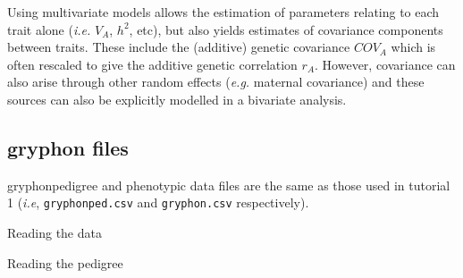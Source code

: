 \documentclass[
  12pt,
]{book}
\newenvironment{Shaded}{\begin{snugshade}}{\end{snugshade}}
\newcommand{\KeywordTok}[1]{\textcolor[rgb]{0.13,0.29,0.53}{\textbf{#1}}}
\newcommand{\NormalTok}[1]{#1}
\newcommand{\OperatorTok}[1]{\textcolor[rgb]{0.81,0.36,0.00}{\textbf{#1}}}
\newcommand{\StringTok}[1]{\textcolor[rgb]{0.31,0.60,0.02}{#1}}
\begin{document}
Using multivariate models allows the estimation of parameters relating to each trait alone (\emph{i.e.} \(V_A\), \(h^2\), etc), but also yields estimates of covariance components between traits. These include the (additive) genetic covariance \(COV_A\) which is often rescaled to give the additive genetic correlation \(r_A\). However, covariance can also arise through other random effects (\emph{e.g.} maternal covariance) and these sources can also be explicitly modelled in a bivariate analysis.

\hypertarget{gryphon-files}{%
\subsection{gryphon files}\label{gryphon-files}}

gryphonpedigree and phenotypic data files are the same as those used in tutorial 1 (\emph{i.e}, \texttt{gryphonped.csv} and \texttt{gryphon.csv} respectively).

Reading the data

\begin{Shaded}
\end{Shaded}

Reading the pedigree

\begin{Shaded}
\end{Shaded}
\end{document}
